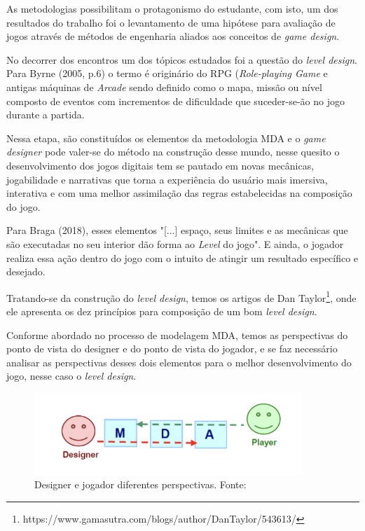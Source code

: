 \documentclass[12pt, onecolumn]{IEEEtran}
\begin{document}
As metodologias possibilitam o protagonismo do estudante, com isto, um dos resultados do trabalho foi o levantamento de uma hipótese para avaliação de jogos através de métodos de engenharia aliados aos conceitos de \textit{game design}.

No decorrer dos encontros um dos tópicos estudados foi a questão do \textit{level design}. Para Byrne (2005, p.6) o termo é originário do RPG (\textit{Role-playing Game} e antigas máquinas de \textit{Arcade} sendo definido como o mapa, missão ou nível composto de eventos com incrementos de dificuldade que suceder-se-ão no jogo durante a partida\cite{b22}.

Nessa etapa, são constituídos os elementos da metodologia MDA e o \textit{game designer} pode valer-se do método na construção desse mundo, nesse quesito o desenvolvimento dos jogos digitais tem se pautado em novas mecânicas, jogabilidade e narrativas que torna a experiência do usuário mais imersiva, interativa e com uma melhor assimilação das regras estabelecidas na composição do jogo.
  
Para Braga (2018), esses elementos "[...] espaço, seus limites e as mecânicas que são executadas no seu interior dão forma ao \textit{Level} do jogo". E ainda, o jogador realiza essa ação dentro do jogo com o intuito de atingir um resultado específico e desejado\cite{b25}.
  
Tratando-se da construção do \textit{level design}, temos os artigos de Dan Taylor\footnote{https://www.gamasutra.com/blogs/author/DanTaylor/543613/}, onde ele apresenta os dez princípios para composição de um bom \textit{level design}.

Conforme abordado no processo de modelagem MDA, temos as perspectivas do ponto de vista do designer e do ponto de vista do jogador, e se faz necessário analisar as perspectivas desses dois elementos para o melhor desenvolvimento do jogo, nesse caso o \textit{level design}\cite{b23}.

  \begin{figure}[H]
    \centering
    \includegraphics[width=0.9\textwidth]{imagens/conclusao-1.png}
    \caption{Designer e jogador diferentes perspectivas. Fonte:\cite{b23}}
    \label{fig:mesh1}
\end{figure}
\end{document}
